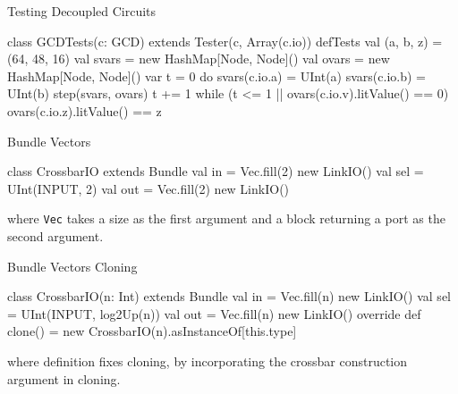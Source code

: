 \documentclass[xcolor=pdflatex,dvipsnames,table]{beamer}
\begin{document}
\begin{frame}[fragile]{Testing Decoupled Circuits}

\begin{scala}
class GCDTests(c: GCD) extends Tester(c, Array(c.io)) {
  defTests {
    val (a, b, z) = (64, 48, 16)
    val svars = new HashMap[Node, Node]()
    val ovars = new HashMap[Node, Node]()
    var t = 0
    do {
      svars(c.io.a) = UInt(a)
      svars(c.io.b) = UInt(b)
      step(svars, ovars)
      t += 1
    } while (t <= 1 || ovars(c.io.v).litValue() == 0)
    ovars(c.io.z).litValue() == z
  }
}
\end{scala}

\end{frame}

\begin{frame}[fragile]{Bundle Vectors}

\begin{scala}
class CrossbarIO extends Bundle {
  val in  = Vec.fill(2){ new LinkIO() }
  val sel = UInt(INPUT, 2)
  val out = Vec.fill(2){ new LinkIO() }
}
\end{scala}

\noindent
where \verb+Vec+ takes a size as the first argument and a block
returning a port as the second argument.

\end{frame}

\begin{frame}[fragile]{Bundle Vectors Cloning}

\begin{scala}
class CrossbarIO(n: Int) extends Bundle {
  val in  = Vec.fill(n){ new LinkIO() }
  val sel = UInt(INPUT, log2Up(n))
  val out = Vec.fill(n){ new LinkIO() }
  override def clone() = new CrossbarIO(n).asInstanceOf[this.type]
}
\end{scala}

\noindent
where  definition fixes cloning, by incorporating the crossbar construction argument  in cloning.

\end{frame}
\end{document}
